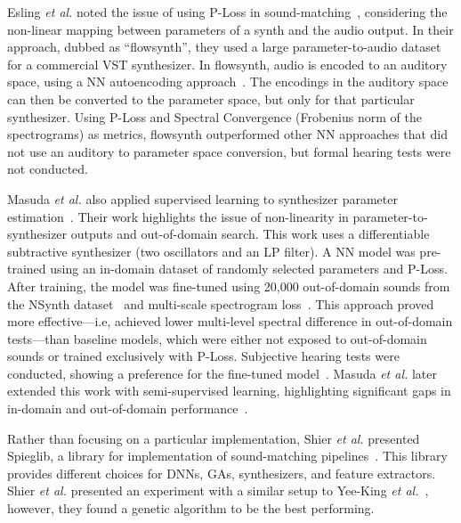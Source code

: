 \documentclass[lettersize,journal]{IEEEtran}
\providecommand{\gls}[1]{#1}
\begin{document}

Esling \textit{et al.} noted the issue of using P-Loss in sound-matching~\cite{esling2019flow}, considering the non-linear mapping between parameters of a synth and the audio output. In their approach, dubbed as ``flowsynth'', they used a large parameter-to-audio dataset for a commercial \gls{VST} synthesizer. In flowsynth, audio is encoded to an auditory space, using a NN autoencoding approach~\cite{hinton2006reducing}. The encodings in the auditory space can then be converted to the parameter space, but only for that particular synthesizer. Using P-Loss and Spectral Convergence (Frobenius norm of the spectrograms) as metrics, flowsynth outperformed other NN approaches that did not use an auditory to parameter space conversion, but formal hearing tests were not conducted.

Masuda \textit{et al.} also applied supervised learning to synthesizer parameter estimation~\cite{masuda2021soundmatch}. Their work highlights the issue of non-linearity in parameter-to-synthesizer outputs and out-of-domain search. This work uses a differentiable subtractive synthesizer (two oscillators and an LP filter). A NN model was pre-trained using an in-domain dataset of randomly selected parameters and P-Loss. After training, the model was fine-tuned using 20,000 out-of-domain sounds from the NSynth dataset~\cite{engel2017neural} and multi-scale spectrogram loss~\cite{engel2020ddsp}. This approach proved more effective---i.e, achieved lower multi-level spectral difference in out-of-domain tests---than baseline models, which were either not exposed to out-of-domain sounds or trained exclusively with P-Loss. Subjective hearing tests were conducted, showing a preference for the fine-tuned model~\cite{masuda2021soundmatch}. Masuda \textit{et al.} later extended this work with semi-supervised learning, highlighting significant gaps in in-domain and out-of-domain performance~\cite{masuda2023improving}.

Rather than focusing on a particular implementation, Shier \textit{et al.} presented Spieglib, a library for implementation of sound-matching pipelines~\cite{shier2020spiegelib}. This library provides different choices for DNNs, GAs, synthesizers, and feature extractors. Shier \textit{et al.} presented an experiment with a similar setup to Yee-King \textit{et al.}~\cite{yee2018automatic}, however, they found a genetic algorithm to be the best performing.
\end{document}
